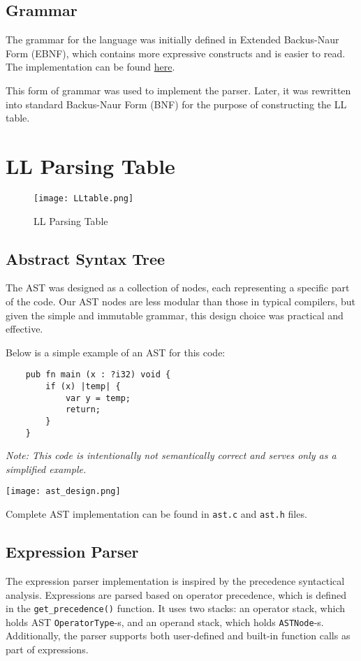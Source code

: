 \documentclass[12pt,a4paper]{article}
\begin{document}
\subsection{Grammar \cite{grammar}}
The grammar for the language was initially defined in Extended Backus-Naur Form (EBNF), which contains more expressive constructs and is easier to read. The implementation can be found 
\href{https://github.com/rm-a0/ifj-compiler/blob/main/doc/grammar\_edited.go}{here}.

This form of grammar was used to implement the parser. Later, it was rewritten into standard Backus-Naur Form (BNF) for the purpose of constructing the LL table.

\newpage
\section*{LL Parsing Table}

\begin{figure}[ht]
    \centering
    \texttt{[image: LLtable.png]} %
    \caption{LL Parsing Table}
    \label{fig:ll_table}
\end{figure}

\subsection{Abstract Syntax Tree \cite{ast}}
The AST was designed as a collection of nodes, each representing a specific part of the code. Our AST nodes are less modular than those in typical compilers, but given the simple and immutable grammar, this design choice was practical and effective.

Below is a simple example of an AST for this code:
\begin{verbatim}
    pub fn main (x : ?i32) void {
        if (x) |temp| {
            var y = temp;
            return;
        }
    } 
\end{verbatim}
\textit{Note: This code is intentionally not semantically correct and serves only as a simplified example.}

\begin{center}
    \texttt{[image: ast\_design.png]}
\end{center}

Complete AST implementation can be found in \texttt{ast.c} and \texttt{ast.h} files.

\subsection{Expression Parser}
The expression parser implementation is inspired by the precedence syntactical analysis. Expressions are parsed based on operator precedence, which is defined in the \texttt{get\_precedence()} function. It uses two stacks: an operator stack, which holds AST \texttt{OperatorType}-s, and an operand stack, which holds \texttt{ASTNode}-s. Additionally, the parser supports both user-defined and built-in function calls as part of expressions.
\end{document}
